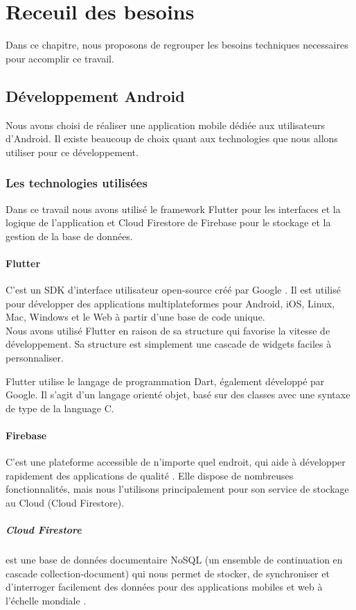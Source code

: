 \documentclass[french, a4paper, 12pt]{report}
\begin{document}

\newpage
\chapter{Receuil des besoins} Dans ce chapitre, nous proposons de regrouper les besoins techniques necessaires pour accomplir ce travail.
	\section{Développement Android} Nous avons choisi de réaliser une application mobile dédiée aux utilisateurs d'Android. Il existe beaucoup de choix quant aux technologies que nous allons utiliser pour ce développement.
		\subsection{Les technologies utilisées} Dans ce travail nous avons utilisé le framework Flutter pour les interfaces et la logique de l'application et Cloud Firestore de Firebase pour le stockage et la gestion de la base de données.
			\subsubsection*{Flutter} C'est un SDK d'interface utilisateur open-source créé par Google \cite{fltr}. Il est utilisé pour développer des applications multiplateformes pour Android, iOS, Linux, Mac, Windows et le Web à partir d'une base de code unique.\\Nous avons utilisé Flutter en raison de sa structure qui favorise la vitesse de développement. Sa structure est simplement une cascade de widgets faciles à personnaliser.

Flutter utilise le langage de programmation Dart, également développé par Google. Il s'agit d'un langage orienté objet, basé sur des classes avec une syntaxe de type de la language C.
			\subsubsection*{Firebase} C'est une plateforme accessible de n'importe quel endroit, qui aide à développer rapidement des applications de qualité \cite{frbs}. Elle dispose de nombreuses fonctionnalités, mais nous l'utilisons principalement pour son service de stockage au Cloud (Cloud Firestore).\\
				\paragraph*{Cloud Firestore} est une base de données documentaire NoSQL (un ensemble de continuation en cascade collection-document) qui nous permet de stocker, de synchroniser et d'interroger facilement des données pour des applications mobiles et web à l'échelle mondiale \cite{fstr}.
\end{document}
